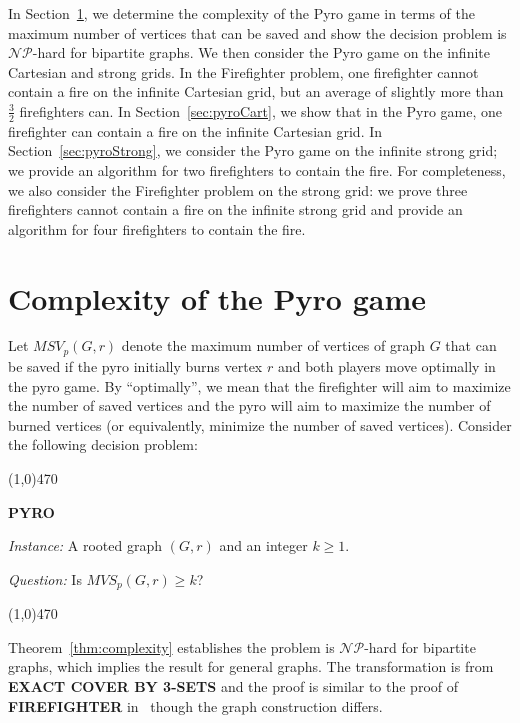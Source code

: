 \documentclass[12pt]{article}
\begin{document}
In Section~\ref{sec:Complexity}, we determine the complexity of the Pyro game in terms of the maximum number of vertices that can be saved and show the decision problem is $\mathcal{NP}$-hard for bipartite graphs.  We then consider the Pyro game on the infinite Cartesian and strong grids.  In the Firefighter problem, one firefighter cannot contain a fire on the infinite Cartesian grid, but an average of slightly more than $\frac{3}{2}$ firefighters can.  In Section~\ref{sec:pyroCart}, we show that in the Pyro game, one firefighter can contain a fire on the infinite Cartesian grid.  In Section~\ref{sec:pyroStrong}, we consider the Pyro game on the infinite strong grid; we provide an algorithm for two firefighters to contain the fire.  For completeness, we also consider the Firefighter problem on the strong grid: we prove three firefighters cannot contain a fire on the infinite strong grid and provide an algorithm for four firefighters to contain the fire.


\section{Complexity of the Pyro game}\label{sec:Complexity}

Let $MSV_p(G,r)$ denote the maximum number of vertices of graph $G$ that can be saved if the pyro initially burns vertex $r$ and both players move optimally in the pyro game. By ``optimally'', we mean that the firefighter will aim to maximize the number of saved vertices and the pyro will aim to maximize the number of burned vertices (or equivalently, minimize the number of saved vertices).  Consider the following decision problem:\medskip

\noindent\line(1,0){470}  

{\small{\textbf{PYRO}}}  

\emph{Instance:} A rooted graph $(G,r)$ and an integer $k \geq 1$.  

\emph{Question:} Is $MVS_p(G,r) \geq k$? \vspace{0.05in}

\noindent\line(1,0){470}\bigskip \smallskip

Theorem~\ref{thm:complexity} establishes the problem is $\mathcal{NP}$-hard for bipartite graphs, which implies the result for general graphs.   The transformation is from {\small{\textbf{EXACT COVER BY 3-SETS}}} and the proof is similar to the proof of {\small{\textbf{FIREFIGHTER}}} in~\cite{MW} though the graph construction differs.\medskip
\end{document}
